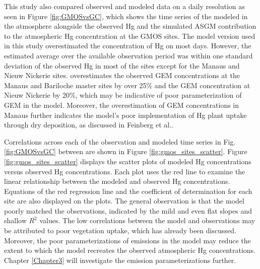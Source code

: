 \begin{flushleft}


 This study also compared observed and modeled data on a daily resolution as seen in Figure \ref{fig:GMOSvsGC}, which shows the time series of the modeled \hgc in the atmosphere alongside the observed Hg and the simulated ASGM contribution to the atmospheric Hg concentration at the GMOS sites. The \gc model version used in this study overestimated the concentration of Hg on most days. However, the \gc estimated average \hgc over the available observation period was within one standard deviation of the observed Hg in most of the sites except for the Manaus and Nieuw Nickerie sites. \gcs overestimates the observed GEM concentrations at the Manaus and Bariloche master sites by over 25\%  and the GEM concentration at Nieuw Nickerie by 20\%, which may be indicative of poor parameterization of GEM in the model. Moreover, the overestimation of GEM concentrations in Manaus further indicates the model's poor implementation of Hg plant uptake through dry deposition, as discussed in Feinberg et al.\cite{feinberg_evaluating_2022}.
\end{flushleft}

\begin{flushleft}
 Correlations across each of the observation and modeled time series in Fig.\ref{fig:GMOSvsGC} between are shown in Figure \ref{fig:gmos_sites_scatter}. Figure \ref{fig:gmos_sites_scatter} displays the scatter plots of modeled Hg concentrations versus observed Hg concentrations. Each plot uses the red line to examine the linear relationship between the modeled and observed Hg concentrations. Equations of the red regression line and the coefficient of determination for each site are also displayed on the plots. The general observation is that the model poorly matched the observations, indicated by the  mild and even flat slopes and shallow $R^2$ values. The low correlations between the model and observations may be attributed to poor vegetation uptake, which has already been discussed\cite{feinberg_evaluating_2022}. Moreover, the poor parameterizations of emissions in the model may reduce the extent to which the model recreates the observed atmospheric Hg concentrations. Chapter \ref{Chapter3} will investigate the emission parameterizations further.
 \end{flushleft}


